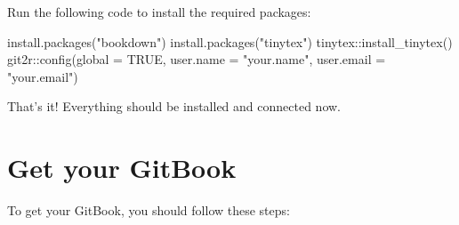 \documentclass[
]{book}
\newenvironment{Shaded}{\begin{snugshade}}{\end{snugshade}}
\newcommand{\AttributeTok}[1]{\textcolor[rgb]{0.77,0.63,0.00}{#1}}
\newcommand{\ConstantTok}[1]{\textcolor[rgb]{0.00,0.00,0.00}{#1}}
\newcommand{\FunctionTok}[1]{\textcolor[rgb]{0.00,0.00,0.00}{#1}}
\newcommand{\NormalTok}[1]{#1}
\newcommand{\SpecialCharTok}[1]{\textcolor[rgb]{0.00,0.00,0.00}{#1}}
\newcommand{\StringTok}[1]{\textcolor[rgb]{0.31,0.60,0.02}{#1}}
\begin{document}
Run the following code to install the required packages:

\begin{Shaded}
\begin{Highlighting}[]
\FunctionTok{install.packages}\NormalTok{(}\StringTok{"bookdown"}\NormalTok{)}
\FunctionTok{install.packages}\NormalTok{(}\StringTok{"tinytex"}\NormalTok{)}
\NormalTok{tinytex}\SpecialCharTok{::}\FunctionTok{install\_tinytex}\NormalTok{()}
\NormalTok{git2r}\SpecialCharTok{::}\FunctionTok{config}\NormalTok{(}\AttributeTok{global =} \ConstantTok{TRUE}\NormalTok{, }\AttributeTok{user.name =} \StringTok{"your.name"}\NormalTok{, }\AttributeTok{user.email =} \StringTok{"your.email"}\NormalTok{)}
\end{Highlighting}
\end{Shaded}

That's it! Everything should be installed and connected now.

\hypertarget{getgitbook}{%
\chapter{Get your GitBook}\label{getgitbook}}

To get your GitBook, you should follow these steps:
\end{document}

